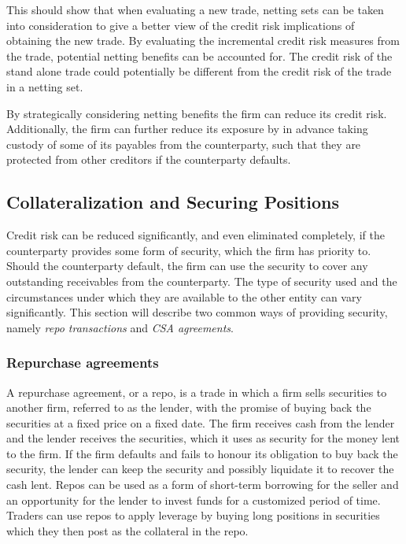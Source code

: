 \documentclass[main.tex]{subfiles}
\begin{document}
        This should show that when evaluating a new trade,
        netting sets can be taken into consideration to give a better view 
        of the credit risk implications of obtaining the new trade.
        By evaluating the incremental credit risk measures from the trade,
        potential netting benefits can be accounted for. 
        The credit risk of the stand alone trade could potentially 
        be different from the credit risk of the trade in a netting set.

        By strategically considering netting benefits the firm can reduce its credit risk. 
        Additionally, the firm can further reduce its exposure by in advance
        taking custody of some of its payables from the counterparty,
        such that they are protected from other creditors if the counterparty defaults.

    \subsection{Collateralization and Securing Positions}
        Credit risk can be reduced significantly, and even eliminated completely,
        if the counterparty provides some form of security, which the firm has priority to.
        Should the counterparty default, the firm can use the security to cover any
        outstanding receivables from the counterparty. 
        The type of security used and the circumstances 
        under which they are available to the other entity can vary significantly.
        This section will describe two common ways of providing security, 
        namely \textit{repo transactions} and \textit{CSA agreements}.

        \subsubsection{Repurchase agreements}
        A repurchase agreement, or a repo, is a trade in which a firm sells securities to another firm, 
        referred to as the lender, 
        with the promise of buying back the securities at a fixed price on a fixed date.
        The firm receives cash from the lender and the lender receives the securities,
        which it uses as security for the money lent to the firm. 
        If the firm defaults and fails to honour its obligation to buy back the security,
        the lender can keep the security and possibly liquidate it to recover the cash lent. 
        Repos can be used as a form of short-term borrowing for the seller
        and an opportunity for the lender to invest funds for a customized period of time. 
        Traders can use repos to apply leverage by buying long positions in securities 
        which they then post as the collateral in the repo. 
\end{document}
